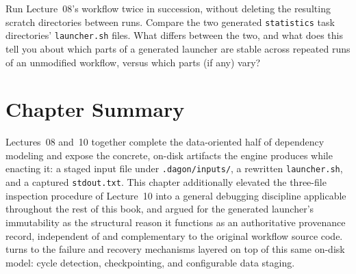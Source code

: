 \begin{exercise}
Run Lecture~08's workflow twice in succession, without deleting the resulting
scratch directories between runs. Compare the two generated
\texttt{statistics} task directories' \texttt{launcher.sh} files. What
differs between the two, and what does this tell you about which parts of a
generated launcher are stable across repeated runs of an unmodified
workflow, versus which parts (if any) vary?
\end{exercise}

\section{Chapter Summary}

Lectures~08 and~10 together complete the data-oriented half of dependency
modeling and expose the concrete, on-disk artifacts the engine produces while
enacting it: a staged input file under \texttt{.dagon/inputs/}, a rewritten
\texttt{launcher.sh}, and a captured \texttt{stdout.txt}. This chapter
additionally elevated the three-file inspection procedure of Lecture~10 into a
general debugging discipline applicable throughout the rest of this book,
and argued for the generated launcher's immutability as the structural
reason it functions as an authoritative provenance record, independent of
and complementary to the original workflow source code. 
turns to the failure and recovery mechanisms layered on top of this same
on-disk model: cycle detection, checkpointing, and configurable data staging.
